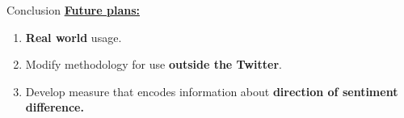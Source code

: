 \documentclass{beamer}
\begin{document}
\begin{frame}[fragile]
\begin{columns}[T]
\begin{column}{.63\textwidth}
\begin{customalertblock}{Conclusion}
    \vspace{0.5cm}
    \underline{\textbf{Future plans:}}
    \vspace{1cm}
    \begin{enumerate}
        \item \textbf{Real world} usage.
        \item Modify methodology for use \textbf{outside the Twitter}.
        \item Develop measure that encodes information about \textbf{direction of sentiment difference.}
    \end{enumerate}
\end{customalertblock}
\end{column}
\end{columns}
\end{frame}
\end{document}
